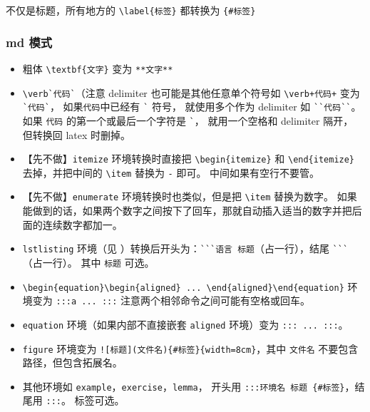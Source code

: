 
不仅是标题，所有地方的 \verb`\label{标签}` 都转换为 \verb`{#标签}`

\subsubsection{md 模式}
\begin{itemize}




\item 粗体 \verb`\textbf{文字}` 变为 \verb`**文字**`
\item \verb|\verb`代码`|（注意 delimiter 也可能是其他任意单个符号如 \verb`\verb+代码+` 变为 \verb|`代码`|， 如果\verb`代码`中已经有 \verb|`| 符号， 就使用多个作为 delimiter 如 \verb|``代码``|。 如果 \verb`代码` 的第一个或最后一个字符是 \verb|`|， 就用一个空格和 delimiter  隔开， 但转换回 latex 时删掉。
\item 【先不做】\verb`itemize` 环境转换时直接把 \verb`\begin{itemize}` 和 \verb`\end{itemize}` 去掉，并把中间的 \verb`\item` 替换为 \verb`-` 即可。 中间如果有空行不要管。
\item 【先不做】\verb`enumerate` 环境转换时也类似，但是把 \verb`\item` 替换为数字。 如果能做到的话，如果两个数字之间按下了回车，那就自动插入适当的数字并把后面的连续数字都加一。
\item \verb`lstlisting` 环境（见 ）转换后开头为：\verb|```语言 标题|（占一行），结尾 \verb|```|（占一行）。 其中 \verb`标题` 可选。
\item \verb`\begin{equation}\begin{aligned} ... \end{aligned}\end{equation}` 环境变为 \verb`:::a ... :::` 注意两个相邻命令之间可能有空格或回车。
\item \verb`equation` 环境（如果内部不直接嵌套 \verb`aligned` 环境）变为 \verb`::: ... :::`。
\item \verb`figure` 环境变为 \verb`![标题](文件名){#标签}{width=8cm}`，其中 \verb`文件名` 不要包含路径，但包含拓展名。
\item 其他环境如 \verb`example`，\verb`exercise`，\verb`lemma`， 开头用 \verb`:::环境名 标题 {#标签}`，结尾用 \verb`:::`。 标签可选。
\end{itemize}


